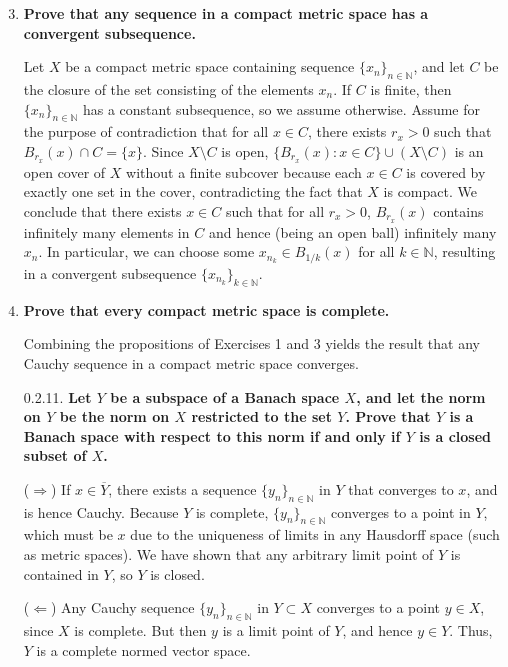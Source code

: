 \documentclass[a4paper,12pt]{article}
\newcommand*\dist{\mathop{\!\mathrm{d}}}
\begin{document}
\begin{enumerate}
    \setcounter{enumi}{2}
    \item
        \boldmath\textbf{Prove that any sequence in a compact metric space has a convergent subsequence.
        }\unboldmath \par
        Let $X$ be a compact metric space containing sequence $\{x_n\}_{n \in \mathbb{N}}$, and let $C$ be the closure of the set consisting of the elements $x_n$. If $C$ is finite, then $\{x_n\}_{n \in \mathbb{N}}$ has a constant subsequence, so we assume otherwise. Assume for the purpose of contradiction that for all $x \in C$, there exists $r_x > 0$ such that $B_{r_x}(x) \cap C = \{x\}$. Since $X \setminus C$ is open, $\{ B_{r_x}(x) : x \in C \} \cup (X \setminus C)$ is an open cover of $X$ without a finite subcover because each $x \in C$ is covered by exactly one set in the cover, contradicting the fact that $X$ is compact. We conclude that there exists $x \in C$ such that for all $r_x > 0$, $B_{r_x}(x)$ contains infinitely many elements in $C$ and hence (being an open ball) infinitely many $x_n$. In particular, we can choose some $x_{n_k} \in B_{1/k}(x)$ for all $k \in \mathbb{N}$, resulting in a convergent subsequence $\{ x_{n_k} \}_{k \in \mathbb{N}}$. %

    \item
        \boldmath\textbf{Prove that every compact metric space is complete.
        }\unboldmath \par
        Combining the propositions of Exercises 1 and 3 yields the result that any Cauchy sequence in a compact metric space converges. %

    \item[0.2.11.]
        \boldmath\textbf{Let $Y$ be a subspace of a Banach space $X$, and let the norm on $Y$ be the norm on $X$ restricted to the set $Y$. Prove that $Y$ is a Banach space with respect to this norm if and only if $Y$ is a closed subset of $X$.
        }\unboldmath \par
        ($\Rightarrow$) If $x \in \overline{Y}$, there exists a sequence $\{y_n\}_{n \in \mathbb{N}}$ in $Y$ that converges to $x$, and is hence Cauchy. Because $Y$ is complete, $\{y_n\}_{n \in \mathbb{N}}$ converges to a point in $Y$, which must be $x$ due to the uniqueness of limits in any Hausdorff space (such as metric spaces). We have shown that any arbitrary limit point of $Y$ is contained in $Y$, so $Y$ is closed. \par
        ($\Leftarrow$) Any Cauchy sequence $\{y_n\}_{n \in \mathbb{N}}$ in $Y \subset X$ converges to a point $y \in X$, since $X$ is complete. But then $y$ is a limit point of $Y$, and hence $y \in Y$. Thus, $Y$ is a complete normed vector space.

\end{enumerate}
\end{document}
